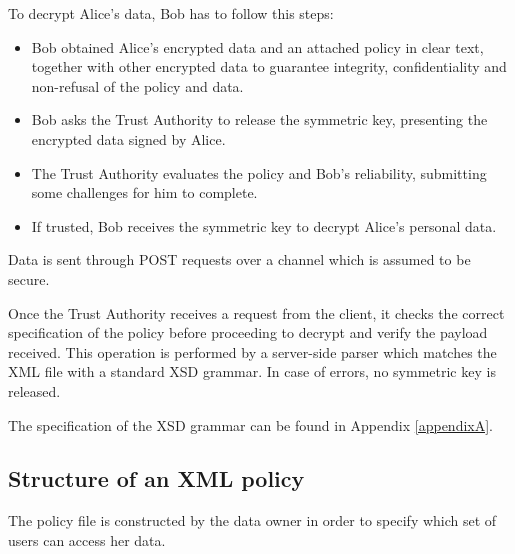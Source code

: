 To decrypt Alice's data, Bob has to follow this steps:
\begin{itemize}
	\item Bob obtained Alice's encrypted data and an attached policy in clear text, together with other encrypted data to guarantee integrity, confidentiality and non-refusal of the policy and data.
	\item Bob asks the Trust Authority to release the symmetric key, presenting the encrypted data signed by Alice.
	\item The Trust Authority evaluates the policy and Bob's reliability, submitting some challenges for him to complete.
	\item If trusted, Bob receives the symmetric key to decrypt Alice's personal data.
\end{itemize}

Data is sent through POST requests over a channel which is assumed to be secure.

Once the Trust Authority receives a request from the client, it checks the correct specification of the policy before proceeding to decrypt and verify the payload received. This operation is performed by a server-side parser which matches the XML file with a standard XSD grammar. In case of errors, no symmetric key is released.

The specification of the XSD grammar can be found in Appendix \ref{appendixA}. 

\subsection{Structure of an XML policy}
The policy file is constructed by the data owner in order to specify which set of users can access her data. 